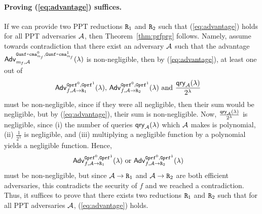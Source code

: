 \documentclass[a4paper,table,dvipsnames]{article}
\theoremstyle{definition}
\newcommand{\M}[1]{\ensuremath{\text{\texttt{#1}}}}
\renewcommand{\O}[1]{\ensuremath{\mathsf{#1}}}
\newcommand{\pcvar}[1]{\ensuremath{\mathit{#1}}}
\newcommand{\m}{\pcvar{m}} %
\begin{document}
\paragraph{Proving (\ref{eq:advantage}) suffices.}
If we can provide two PPT reductions $\M{R}_1$ and 
$\M{R}_2$ such that (\ref{eq:advantage}) holds for all PPT adversaries $\mathcal{A}$,
then Theorem~\ref{thm:prfprg} follows. Namely, assume towards contradiction
that there exist an adversary $\mathcal{A}$ such that the advantage $\mathsf{Adv}^{\M{Gunf\text{-}cma}_{\m_f}^0,\M{Gunf\text{-}cma}_{\m_f}^1}_{\m_f,\adv}(\lambda)$
is non-negligible, then by (\ref{eq:advantage}), at least one out of
\begin{align*}
   &\mathsf{Adv}^{\M{Gprf}^0,\M{Gprf}^1}_{f,\adv\rightarrow\M{R}_1}(\lambda),\,\mathsf{Adv}^{\M{Gprf}^0,\M{Gprf}^1}_{f,\adv\rightarrow\M{R}_2}(\lambda)\text{ and }\frac{\O{qry}_{\adv}(\lambda)}{2^\lambda}
\end{align*}
must be non-negligible, since if they were all negligible, then their sum would
be negligible, but by (\ref{eq:advantage}), their sum is non-negligible. Now,
$\frac{\O{qry}_{\adv}(\lambda)}{2^\lambda}$ is negligible, since (i)
the number of queries $\O{qry}_{\adv}(\lambda)$ which $\mathcal{A}$ makes is
polynomial, (ii) $\frac{1}{2^\lambda}$ is negligible, and (iii) multiplying
a negligible function by a polynomial yields a negligible function. Hence,
\begin{align*}
   &\mathsf{Adv}^{\M{Gprf}^0,\M{Gprf}^1}_{f,\adv\rightarrow\M{R}_1}(\lambda)\text{ or }\mathsf{Adv}^{\M{Gprf}^0,\M{Gprf}^1}_{f,\adv\rightarrow\M{R}_2}(\lambda)
\end{align*}
must be non-negligible, but since $\adv\rightarrow\M{R}_1$ and $\adv\rightarrow\M{R}_2$
are both efficient adversaries, this contradicts the security of $f$ and we reached
a contradiction. Thus, it suffices to prove that there exists two reductions $\M{R}_1$
and $\M{R}_2$ such that for all PPT adversaries $\mathcal{A}$, (\ref{eq:advantage}) holds.
\end{document}
